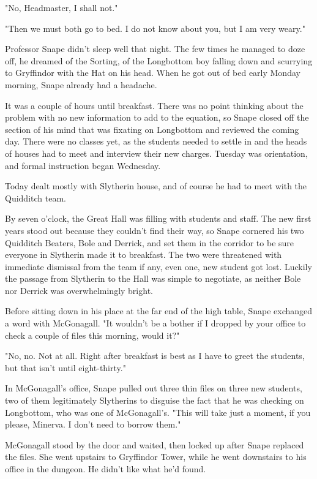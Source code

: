 "No, Headmaster, I shall not."

"Then we must both go to bed. I do not know about you, but I am very weary."

Professor Snape didn't sleep well that night. The few times he managed to doze off, he dreamed of the Sorting, of the Longbottom boy falling down and scurrying to Gryffindor with the Hat on his head. When he got out of bed early Monday morning, Snape already had a headache.

It was a couple of hours until breakfast. There was no point thinking about the problem with no new information to add to the equation, so Snape closed off the section of his mind that was fixating on Longbottom and reviewed the coming day. There were no classes yet, as the students needed to settle in and the heads of houses had to meet and interview their new charges. Tuesday was orientation, and formal instruction began Wednesday.

Today dealt mostly with Slytherin house, and of course he had to meet with the Quidditch team.

By seven o'clock, the Great Hall was filling with students and staff. The new first years stood out because they couldn't find their way, so Snape cornered his two Quidditch Beaters, Bole and Derrick, and set them in the corridor to be sure everyone in Slytherin made it to breakfast. The two were threatened with immediate dismissal from the team if any, even one, new student got lost. Luckily the passage from Slytherin to the Hall was simple to negotiate, as neither Bole nor Derrick was overwhelmingly bright.

Before sitting down in his place at the far end of the high table, Snape exchanged a word with McGonagall. "It wouldn't be a bother if I dropped by your office to check a couple of files this morning, would it?"

"No, no. Not at all. Right after breakfast is best as I have to greet the students, but that isn't until eight-thirty."

In McGonagall's office, Snape pulled out three thin files on three new students, two of them legitimately Slytherins to disguise the fact that he was checking on Longbottom, who was one of McGonagall's. "This will take just a moment, if you please, Minerva. I don't need to borrow them."

McGonagall stood by the door and waited, then locked up after Snape replaced the files. She went upstairs to Gryffindor Tower, while he went downstairs to his office in the dungeon. He didn't like what he'd found.

